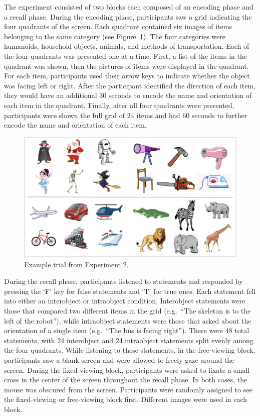 \documentclass[
  man,floatsintext]{apa6}
\begin{document}
The experiment consisted of two blocks each composed of an encoding
phase and a recall phase. During the encoding phase, participants saw a
grid indicating the four quadrants of the screen. Each quadrant
contained six images of items belonging to the same category (see Figure~\ref{fig:E2-example-trial}).
The four categories were humanoids, household objects, animals, and
methods of transportation.
Each of the four quadrants was presented one at a time. First, a list of
the items in the quadrant was shown, then the pictures of items were displayed in the quadrant.
For each item, participants used their arrow keys to indicate whether the object was facing left or right. After the participant identified the direction of each
item, they would have an additional 30 seconds to encode the name and
orientation of each item in the quadrant. Finally, after all four quadrants
were presented, participants were shown the full grid of
24 items and had 60 seconds to further encode the name and orientation
of each item.

\begin{figure}
\centering
\includegraphics{group-b/E2-example-figure.jpeg}
\caption{\label{fig:E2-example-trial}Example trial from Experiment 2.}
\end{figure}

During the recall phase, participants listened to statements and
responded by pressing the `F' key for false statements and `T' for true
ones. Each statement fell into either an interobject or intraobject
condition. Interobject statements were those that compared two different
items in the grid (e.g.~``The skeleton is to the left of the robot''),
while intraobject statements were those that asked about the orientation
of a single item (e.g.~``The bus is facing right''). There were 48 total
statements, with 24 interobject and 24 intraobject statements split
evenly among the four quadrants. While listening to these statements, in
the free-viewing block, participants saw a blank screen and were allowed
to freely gaze around the screen. During the fixed-viewing block,
participants were asked to fixate a small cross in the center of the
screen throughout the recall phase. In both cases, the mouse was
obscured from the screen. Participants were randomly assigned to see the
fixed-viewing or free-viewing block first. Different images were used in each block.
\end{document}
